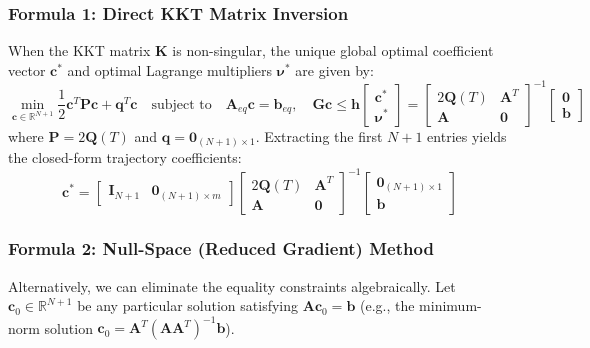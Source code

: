 \documentclass[11pt,a4paper]{article}
\begin{document}
\subsubsection{Formula 1: Direct KKT Matrix Inversion}
When the KKT matrix $\mathbf{K}$ is non-singular, the unique global optimal coefficient vector $\mathbf{c}^*$ and optimal Lagrange multipliers $\boldsymbol{\nu}^*$ are given by:
\begin{equation}
\label{eq:standard_qp}
\min_{\mathbf{c} \in \mathbb{R}^{N+1}} \frac{1}{2} \mathbf{c}^T \mathbf{P} \mathbf{c} + \mathbf{q}^T \mathbf{c}
\quad \text{subject to} \quad
\mathbf{A}_{eq} \mathbf{c} = \mathbf{b}_{eq}, \quad \mathbf{G} \mathbf{c} \le \mathbf{h}
\label{eq:closed_form_kkt_inv}
\begin{bmatrix}
\mathbf{c}^* \\
\boldsymbol{\nu}^*
\end{bmatrix}
=
\begin{bmatrix}
2\mathbf{Q}(T) & \mathbf{A}^T \\
\mathbf{A} & \mathbf{0}
\end{bmatrix}^{-1}
\begin{bmatrix}
\mathbf{0} \\
\mathbf{b}
\end{bmatrix}
\end{equation}
where $\mathbf{P} = 2 \mathbf{Q}(T)$ and $\mathbf{q} = \mathbf{0}_{(N+1) \times 1}$.
Extracting the first $N+1$ entries yields the closed-form trajectory coefficients:
\begin{equation}
\label{eq:closed_form_c_star}
\mathbf{c}^* = \begin{bmatrix} \mathbf{I}_{N+1} & \mathbf{0}_{(N+1) \times m} \end{bmatrix}
\begin{bmatrix}
2\mathbf{Q}(T) & \mathbf{A}^T \\
\mathbf{A} & \mathbf{0}
\end{bmatrix}^{-1}
\begin{bmatrix}
\mathbf{0}_{(N+1) \times 1} \\
\mathbf{b}
\end{bmatrix}
\end{equation}

\subsubsection{Formula 2: Null-Space (Reduced Gradient) Method}
Alternatively, we can eliminate the equality constraints algebraically. Let $\mathbf{c}_0 \in \mathbb{R}^{N+1}$ be any particular solution satisfying $\mathbf{A} \mathbf{c}_0 = \mathbf{b}$ (e.g., the minimum-norm solution $\mathbf{c}_0 = \mathbf{A}^T (\mathbf{A}\mathbf{A}^T)^{-1}\mathbf{b}$). 
\end{document}
